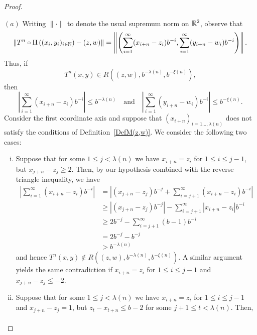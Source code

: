 \documentclass[10pt,a4paper]{amsart}
\newcommand{\N}{{\Bbb N}}         %
\newcommand{\R}{{\Bbb R}}        %
\begin{document}
 \begin{proof} \,
 
\noindent $(a)$  Writing $\|\cdot\|$ to denote the usual supremum norm on $\R^{2}$, observe that
 \begin{equation*}
     \left\|T^{n} \circ \Pi\left((x_{i},y_{i})_{i \in \N}\right)-(z,w)\right\|=\left\|\left(\sum_{i=1}^{\infty}(x_{i+n}-z_{i})b^{-i}, \sum_{i=1}^{\infty}(y_{i+n}-w_{i})b^{-i} \right) \right\|.
 \end{equation*}
Thus, if 
 \begin{equation*}
     T^{n}(x,y) \in R\left((z,w), b^{-\lambda(n)}, b^{-\xi(n)} \right),
 \end{equation*}
 then
 \begin{equation*}
     \left|\sum_{i=1}^{\infty}(x_{i+n}-z_{i})b^{-i}\right| \leq b^{-\lambda(n)} \quad \text{and} \quad \left| \sum_{i=1}^{\infty}(y_{i+n}-w_{i})b^{-i} \right| \leq b^{-\xi(n)}.
 \end{equation*}
 Consider the first coordinate axis and suppose that $(x_{i+n})_{i=1 \dots , \lambda(n)}$ does not satisfy the conditions of Definition~\ref{DefM(z,w)}. We consider the following two cases:
\begin{enumerate}[(i)] 
  \item Suppose that for some $1 \leq j<\lambda(n)$ we have $x_{i+n}=z_{i}$ for $1 \leq i \leq j-1$, but $x_{j+n}-z_{j}\geq2$. Then, {by our hypothesis combined with the reverse triangle inequality, we have}
 \begin{align*}
     \left|\sum_{i=1}^{\infty}(x_{i+n}-z_{i})b^{-i}\right| &= \left| (x_{j+n}-z_{j})b^{-j}+ \sum_{i=j+1}^{\infty}(x_{i+n}-z_{i})b^{-i}\right| \\[1ex] 
     &{\geq \left|(x_{j+n}-z_j)b^{-j}\right| - \sum_{i=j+1}^{\infty}{\left|x_{i+n}-z_i\right|b^{-i}}} \\[1ex] 
     	&\geq 2b^{-j}-\sum_{i=j+1}^{\infty}{(b-1)b^{-i}} \\[1ex]
        &= 2b^{-j}-b^{-j} \\[1ex]
        &>b^{-\lambda(n)}
 \end{align*}
and hence $T^{n}(x,y) \not \in R\left((z,w), b^{-\lambda(n)}, b^{-\xi(n)} \right)$. {A similar argument yields the same contradiction} if $x_{i+n}=z_i$ for $1 \leq i \leq j-1$ and $x_{j+n}-z_{j}\leq-2$. 
 \item Suppose that for some $1 \leq j < \lambda(n)$ we have $x_{i+n}=z_{i}$ for $1 \leq i \leq j-1$ and $x_{j+n}-z_{j}=1$, but $z_{t}-x_{t+n}\leq b-2$ for some $j+1 \leq t < \lambda(n)$. Then,
 \begin{align*} 

\end{align*}
\end{enumerate}
\end{proof}
\end{document}
